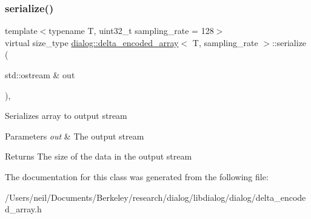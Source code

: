 \subsubsection{\texorpdfstring{serialize()}{serialize()}}
{\footnotesize\ttfamily template$<$typename T, uint32\+\_\+t sampling\+\_\+rate = 128$>$ \\
virtual size\+\_\+type \hyperlink{classdialog_1_1delta__encoded__array}{dialog\+::delta\+\_\+encoded\+\_\+array}$<$ T, sampling\+\_\+rate $>$\+::serialize (\begin{DoxyParamCaption}\item[{std\+::ostream \&}]{out }\end{DoxyParamCaption})\hspace{0.3cm}{\ttfamily [inline]}, {\ttfamily [virtual]}}

Serializes array to output stream 
\begin{DoxyParams}{Parameters}
{\em out} & The output stream \\
\hline
\end{DoxyParams}
\begin{DoxyReturn}{Returns}
The size of the data in the output stream 
\end{DoxyReturn}


The documentation for this class was generated from the following file\+:\begin{DoxyCompactItemize}
\item 
/\+Users/neil/\+Documents/\+Berkeley/research/dialog/libdialog/dialog/delta\+\_\+encoded\+\_\+array.\+h\end{DoxyCompactItemize}
